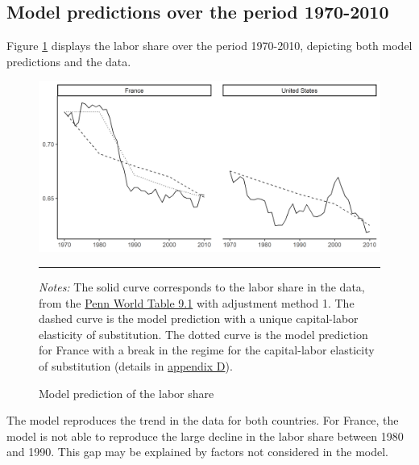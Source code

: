 \subsection{Model predictions over the period 1970-2010}\label{subsec:model_pred}

Figure \ref{fig:baseline7010} displays the labor share over the period 1970-2010, depicting both model predictions and the data.
\begin{figure}[tb]
	\centering
	\includegraphics[width=1\linewidth]{../result/baseline7010.png}
	\caption{Model prediction of the labor share}
	\label{fig:baseline7010}
	\vspace{.5ex}
	\hrule
	\vspace{-4ex}
	\justify\singlespacing\footnotesize \textit{Notes:} The solid curve corresponds to the labor share in the data, from the \href{https://www.rug.nl/ggdc/productivity/pwt/}{Penn World Table 9.1} with adjustment method 1. The dashed curve is the model prediction with a unique capital-labor elasticity of substitution. The dotted curve is the model prediction for France with a break in the regime for the capital-labor elasticity of substitution (details in \hyperref[appendix:regime]{appendix D}).
\end{figure}
The model reproduces the trend in the data for both countries. For France, the model is not able to reproduce the large decline in the labor share between 1980 and 1990. This gap may be explained by factors not considered in the model.
